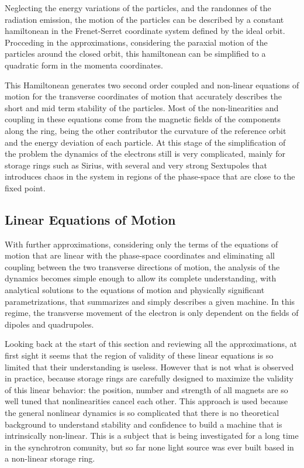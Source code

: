 \documentclass[
	12pt,				%
	openright,			%
	oneside,			%
	a4paper,		%
	chapter=TITLE,		%
	section=TITLE,		%
    brazil,				%
	english,			%
	sumario=tradicional,
	]{abntex2}
\begin{document}
    Neglecting the energy variations of the particles, and the randonnes of the radiation emission, the motion of the particles can be described by a constant hamiltonean in the Frenet-Serret coordinate system defined by the ideal orbit. Procceding in the approximations, considering the paraxial motion of the particles around the closed orbit, this hamiltonean can be simplified to a quadratic form in the momenta coordinates.

    This Hamiltonean generates two second order coupled and non-linear equations of motion for the transverse coordinates of motion that accurately describes the short and mid term stability of the particles. Most of the non-linearities and coupling in these equations come from the magnetic fields of the components along the ring, being the other contributor the curvature of the reference orbit and the energy deviation of each particle. At this stage of the simplification of the problem the dynamics of the electrons still is very complicated, mainly for storage rings such as Sirius, with several and very strong Sextupoles that introduces chaos in the system in regions of the phase-space that are close to the fixed point.

    \subsection{Linear Equations of Motion}

	With further approximations, considering only the terms of the equations of motion that are linear with the phase-space coordinates and eliminating all coupling between the two transverse directions of motion, the analysis of the dynamics becomes simple enough to allow its complete understanding, with analytical solutions to the equations of motion and physically significant parametrizations, that summarizes and simply describes a given machine. In this regime, the transverse movement of the electron is only dependent on the fields of dipoles and quadrupoles.

	Looking back at the start of this section and reviewing all the approximations, at first sight it seems that the region of validity of these linear equations is so limited that their understanding is useless. However that is not what is observed in practice, because storage rings are carefully designed to maximize the validity of this linear behavior: the position, number and strength of all magnets are so well tuned that nonlinearities cancel each other. This approach is used because the general nonlinear dynamics is so complicated that there is no theoretical background to understand stability and confidence to build a machine that is intrinsically non-linear. This is a subject that is being investigated for a long time in the synchrotron comunity, but so far none light source was ever built based in a non-linear storage ring.
\end{document}

